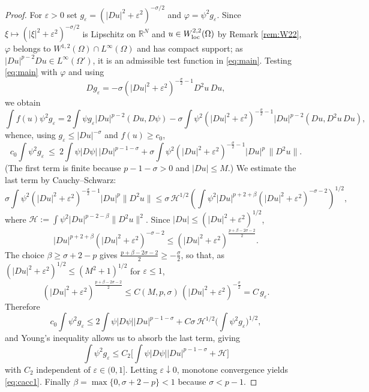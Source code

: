 \documentclass[reqno]{amsart}
\theoremstyle{plain}
\theoremstyle{definition}
\theoremstyle{remark}
\newcommand{\R}{\mathbb{R}}
\newcommand{\eps}{\varepsilon}
\begin{document}
\begin{proof}
For $\eps>0$ set $g_\eps=(|Du|^2+\eps^2)^{-\sigma/2}$ and $\varphi=\psi^2g_\eps$. Since
$\xi\mapsto(|\xi|^2+\eps^2)^{-\sigma/2}$ is Lipschitz on $\R^N$ and $u\in W^{2,2}_{\rm loc}(\Omega)$
by Remark \ref{rem:W22}, $\varphi$ belongs to $W^{1,2}(\Omega)\cap L^\infty(\Omega)$ and has compact
support; as $|Du|^{p-2}Du\in L^\infty(\Omega')$, it is an admissible test function in
\eqref{eq:main}. Testing \eqref{eq:main} with $\varphi$ and using
\[
Dg_\eps=-\sigma(|Du|^2+\eps^2)^{-\frac\sigma2-1}D^2u\,Du,
\]
we obtain
\[
\int f(u)\psi^2g_\eps
=2\int\psi g_\eps|Du|^{p-2}(Du,D\psi)
-\sigma\int\psi^2(|Du|^2+\eps^2)^{-\frac\sigma2-1}|Du|^{p-2}(Du,D^2u\,Du),
\]
whence, using $g_\eps\le|Du|^{-\sigma}$ and $f(u)\ge c_0$,
\begin{equation}\label{eq:step1}
c_0\int\psi^2g_\eps\ \le\ 2\int\psi|D\psi|\,|Du|^{p-1-\sigma}
+\sigma\int\psi^2(|Du|^2+\eps^2)^{-\frac\sigma2-1}|Du|^{p}\,\|D^2u\| .
\end{equation}
(The first term is finite because $p-1-\sigma>0$ and $|Du|\le M$.) We estimate the last term by
Cauchy--Schwarz:
\[
\sigma\int\psi^2(|Du|^2+\eps^2)^{-\frac\sigma2-1}|Du|^{p}\|D^2u\|
\le\sigma\,\mathcal H^{1/2}\left(\int\psi^2|Du|^{p+2+\beta}(|Du|^2+\eps^2)^{-\sigma-2}\right)^{1/2},
\]
where $\mathcal H:=\int\psi^2|Du|^{p-2-\beta}\|D^2u\|^2$. Since $|Du|\le(|Du|^2+\eps^2)^{1/2}$,
\[
|Du|^{p+2+\beta}(|Du|^2+\eps^2)^{-\sigma-2}\le(|Du|^2+\eps^2)^{\frac{p+\beta-2\sigma-2}{2}} .
\]
The choice $\beta\ge\sigma+2-p$ gives $\frac{p+\beta-2\sigma-2}{2}\ge-\frac\sigma2$, so that, as
$(|Du|^2+\eps^2)^{1/2}\le(M^2+1)^{1/2}$ for $\eps\le1$,
\[
(|Du|^2+\eps^2)^{\frac{p+\beta-2\sigma-2}{2}}\le C(M,p,\sigma)\,(|Du|^2+\eps^2)^{-\frac\sigma2}=C\,g_\eps .
\]
Therefore
\[
c_0\int\psi^2g_\eps\le 2\int\psi|D\psi||Du|^{p-1-\sigma}+C\sigma\,\mathcal H^{1/2}\Big(\int\psi^2g_\eps\Big)^{1/2},
\]
and Young's inequality allows us to absorb the last term, giving
\[
\int\psi^2g_\eps\le C_2\Big[\int\psi|D\psi||Du|^{p-1-\sigma}+\mathcal H\Big]
\]
with $C_2$ independent of $\eps\in(0,1]$. Letting $\eps\downarrow0$, monotone convergence yields
\eqref{eq:cacc1}. Finally $\beta=\max\{0,\sigma+2-p\}<1$ because $\sigma<p-1$.
\end{proof}
\end{document}
